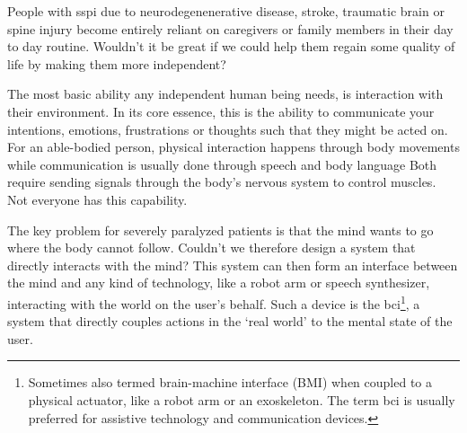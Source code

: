 
People with \ac{sspi} due to
neurodegenenerative disease, stroke, traumatic brain or spine injury
become entirely reliant on caregivers or family members in their day to day
routine.
Wouldn't it be great if we could help them regain some quality of life by
making them more independent?

The most basic ability any independent human being needs, is interaction with
their environment.
In its core essence, this is the ability to communicate your intentions,
emotions, frustrations or thoughts such that they might be acted on.
For an able-bodied person, physical interaction happens through body movements
while communication is usually done through speech and body language
Both require sending signals through the body's nervous system to control
muscles.
Not everyone has this capability.

The key problem for severely paralyzed patients is that the mind wants to go
where the body cannot follow.
Couldn't we therefore design a system that directly interacts with the mind?
This system can then form an interface between the mind and any kind of
technology, like a robot arm or speech synthesizer, interacting with the world
on the user's behalf.
Such a device is the \ac{bci}\footnote{Sometimes also
termed brain-machine interface (BMI) when coupled to a physical actuator, like
a robot arm or an exoskeleton.
The term \ac{bci} is usually preferred for
assistive technology and communication devices.
},
a system that directly couples actions in the `real world' to the mental state of
the user.


